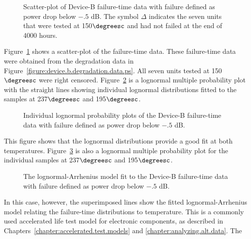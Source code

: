 \begin{figure}
\caption{Scatter-plot of Device-B failure-time data
with failure defined as power drop below $-.5$ dB. The symbol $\Delta$
indicates the seven units that were tested at 150$\degreesc$ and had not
failed at the end of 4000 hours.}
\label{figure:device.b.alt.scatter.ps}
\end{figure}
Figure~\ref{figure:device.b.alt.scatter.ps} shows a scatter-plot of
the failure-time data. These failure-time data were
obtained from the degradation data in
Figure~\ref{figure:device.b.degradation.data.ps}. 
All seven units tested at 150$\degreesc$ were right censored.
Figure~\ref{figure:device.b.groupi.lognormal.ps} is a lognormal multiple
probability plot with the straight lines showing individual
lognormal distributions fitted to the samples at 237$\degreesc$ and
195$\degreesc$.
\begin{figure}
\caption{Individual lognormal probability 
plots of the Device-B failure-time data with failure defined as
power drop below $-.5$ dB.}
\label{figure:device.b.groupi.lognormal.ps}
\end{figure}
This figure shows that the lognormal distributions provide a good fit
at both temperatures.
Figure~\ref{figure:device.b.groupm.lognormal.ps} is also a lognormal multiple
probability plot for the individual samples at
237$\degreesc$ and 195$\degreesc$.
\begin{figure}
\caption{The lognormal-Arrhenius model fit to the Device-B failure-time
data with failure defined as power drop below $-.5$ dB.}
\label{figure:device.b.groupm.lognormal.ps}
\end{figure}
In this case, however, the superimposed lines show the fitted
lognormal-Arrhenius model
relating the failure-time distributions to temperature.
This is a commonly used accelerated life test model for electronic
components, as described in Chapters~\ref{chapter:accelerated.test.models} and 
\ref{chapter:analyzing.alt.data}. The
